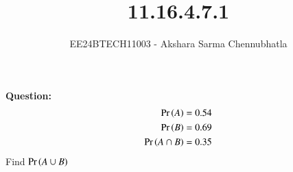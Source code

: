 \documentclass[journal]{IEEEtran}
\begin{document}

\vspace{3cm}

\title{11.16.4.7.1}
\author{EE24BTECH11003 - Akshara Sarma Chennubhatla}
{\let\newpage\relax\maketitle}
\textbf{Question:\\}
\begin{align}
	\Pr\left(A\right) &= 0.54\\
	\Pr\left(B\right) &= 0.69\\
	\Pr\left(A \cap B\right) &= 0.35
\end{align}
Find $\Pr\left(A \cup B\right)$\\

\solution\\
\end{document}
